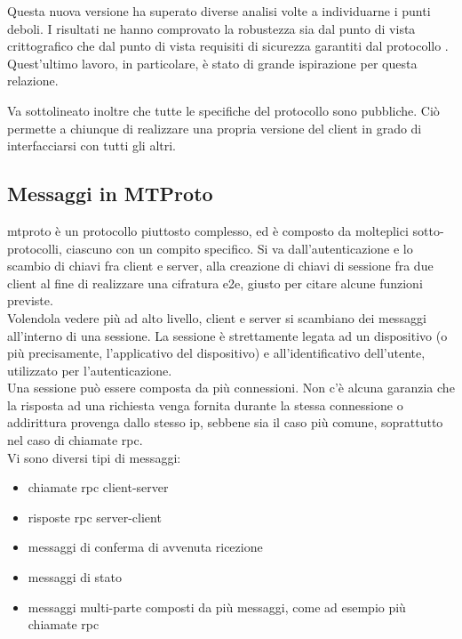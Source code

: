 Questa nuova versione ha superato diverse analisi volte a individuarne i punti deboli.
I risultati ne hanno comprovato la robustezza sia dal punto di vista crittografico \cite{inp:mtproto-attacks}
che dal punto di vista requisiti di sicurezza garantiti dal protocollo \cite{inp:mtproto-proverif}. \\
Quest'ultimo lavoro, in particolare, è stato di grande ispirazione per questa relazione.

Va sottolineato inoltre che tutte le specifiche del protocollo sono pubbliche.
Ciò permette a chiunque di realizzare una propria versione del client in grado di interfacciarsi con tutti gli altri. \\

\subsection{Messaggi in MTProto}

\gls{mtproto} è un protocollo piuttosto complesso, ed è composto da molteplici sotto-protocolli, ciascuno con un compito specifico.
Si va dall'autenticazione e lo scambio di chiavi fra client e server, alla creazione di chiavi di sessione fra due client
al fine di realizzare una cifratura \gls{e2e}, giusto per citare alcune funzioni previste. \\
Volendola vedere più ad alto livello, client e server si scambiano dei messaggi all'interno di una sessione.
La sessione è strettamente legata ad un dispositivo (o più precisamente, l'applicativo del dispositivo)
e all'identificativo dell'utente, utilizzato per l'autenticazione. \\
Una sessione può essere composta da più connessioni.
Non c'è alcuna garanzia che la risposta ad una richiesta venga fornita durante la stessa connessione o addirittura provenga dallo stesso \gls{ip},
sebbene sia il caso più comune, soprattutto nel caso di chiamate \gls{rpc}. \\

Vi sono diversi tipi di messaggi:
\begin{itemize}
    \item chiamate \gls{rpc} client-server
    \item risposte \gls{rpc} server-client
    \item messaggi di conferma di avvenuta ricezione
    \item messaggi di stato
    \item messaggi multi-parte composti da più messaggi, come ad esempio più chiamate \gls{rpc}
\end{itemize}

